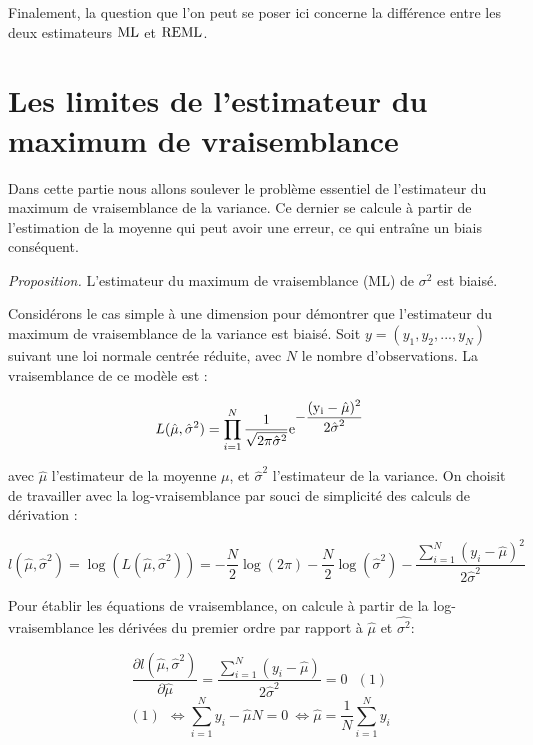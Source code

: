 \vspace{4mm}

Finalement, la question que l'on peut se poser ici concerne la différence entre les deux estimateurs $\rm{ML}$ et $\rm{REML}$.


\section{Les limites de l'estimateur du maximum de vraisemblance}

Dans cette partie nous allons soulever le problème essentiel de l'estimateur du maximum de vraisemblance de la variance. Ce dernier se calcule à partir de l'estimation de la moyenne qui peut avoir une erreur, ce qui entraîne un biais conséquent.

\vspace{4mm}

\emph{Proposition.} L'estimateur du maximum de vraisemblance (ML) de $\sigma^2$ est biaisé.

\vspace{4mm}

Considérons le cas simple à une dimension pour démontrer que l'estimateur du maximum de vraisemblance de la variance est biaisé. Soit $y = (y_1, y_2, ..., y_N)$ suivant une loi normale centrée réduite, avec $N$ le nombre d'observations. La vraisemblance de ce modèle est :  

$$
L(\hat{\mu},\hat{\sigma}^2)=\prod_{i=1}^N{\frac{1}{\sqrt{2\pi \hat{\sigma}^2}}}\rm{\large e}^{\displaystyle -\frac{\displaystyle (y_i-\hat{\mu})^2}{\displaystyle 2\hat{\sigma}^2}}
$$

avec $\hat{\mu}$ l'estimateur de la moyenne $\mu$, et $\hat{\sigma}^2$ l'estimateur de la variance. On choisit de travailler avec la log-vraisemblance par souci de simplicité des calculs de dérivation :

$$
l(\hat{\mu},\hat{\sigma}^2)=\log\left(L(\hat{\mu},\hat{\sigma}^2)\right)=-\frac{N}{2}\log(2\pi)-\frac{N}{2}\log(\hat{\sigma}^2)-\frac{\displaystyle \sum_{i=1}^N(y_i-\hat{\mu})^2}{\displaystyle 2\hat{\sigma}^2}
$$

Pour établir les équations de vraisemblance, on calcule à partir de la log-vraisemblance les dérivées du premier ordre par rapport à $\hat{\mu}$ et $\hat{\sigma^2}$:



    $$\frac{\partial{l(\hat{\mu},\hat{\sigma}^2)}}{\partial\hat{\mu}}=\frac{\displaystyle\sum_{i=1}^N(y_i-\hat{\mu})}{\displaystyle 2\hat{\sigma}^2}=0 \ \ \ (1)$$
    $$(1) \ \ \Leftrightarrow \sum_{i=1}^N{y_i}-\hat{\mu}N=0 \ \Leftrightarrow \hat{\mu}=\frac{1}{N}\sum_{i=1}^N{y_i}$$


